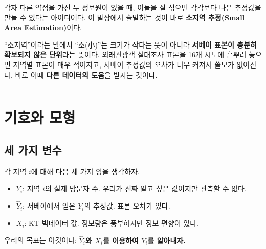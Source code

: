 \documentclass[
  letterpaper,
  DIV=11,
  numbers=noendperiod]{scrreprt}
\providecommand{\tightlist}{%
  \setlength{\itemsep}{0pt}\setlength{\parskip}{0pt}}
\begin{document}
각자 다른 약점을 가진 두 정보원이 있을 때, 이들을 잘 섞으면 각각보다
나은 추정값을 만들 수 있다는 아이디어다. 이 발상에서 출발하는 것이 바로
\textbf{소지역 추정(Small Area Estimation)}이다.

``소지역''이라는 말에서 ``소(小)''는 크기가 작다는 뜻이 아니라
\textbf{서베이 표본이 충분히 확보되지 않은 단위}라는 뜻이다. 외래관광객
실태조사 표본을 16개 시도에 흩뿌려 놓으면 지역별 표본이 매우 적어지고,
서베이 추정값의 오차가 너무 커져서 쓸모가 없어진다. 바로 이때
\textbf{다른 데이터의 도움}을 받자는 것이다.

\begin{center}\rule{0.5\linewidth}{0.5pt}\end{center}

\section{기호와 모형}\label{uxae30uxd638uxc640-uxbaa8uxd615}

\subsection{세 가지 변수}\label{uxc138-uxac00uxc9c0-uxbcc0uxc218}

각 지역 \(i\)에 대해 다음 세 가지 양을 생각하자.

\begin{itemize}
\tightlist
\item
  \(Y_i\): 지역 \(i\)의 실제 방문자 수. 우리가 진짜 알고 싶은 값이지만
  관측할 수 없다.
\item
  \(\hat{Y}_i\): 서베이에서 얻은 \(Y_i\)의 추정값. 표본 오차가 있다.
\item
  \(X_i\): KT 빅데이터 값. 정보량은 풍부하지만 정보 편향이 있다.
\end{itemize}

우리의 목표는 이것이다: \textbf{\(\hat{Y}_i\)와 \(X_i\)를 이용하여
\(Y_i\)를 알아내자.}
\end{document}
